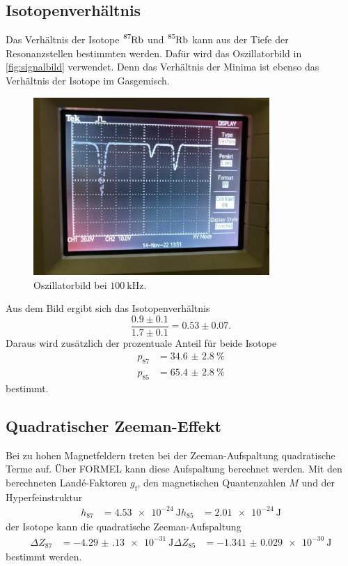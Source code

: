 \subsection{Isotopenverhältnis}
\label{ssec:verhältnis}

Das Verhältnis der Isotope $\ce{^{87}Rb}$ und $\ce{^{85}Rb}$ kann aus der Tiefe der Resonanzstellen bestimmten werden.
Dafür wird das Oszillatorbild in \autoref{fig:signalbild} verwendet.
Denn das Verhältnis der Minima ist ebenso das Verhältnis der Isotope im Gasgemisch.
\begin{figure}
    \centering
    \includegraphics[width=0.8\textwidth]{plots/signalbild.jpeg}
    \caption{Oszillatorbild bei $\qty{100}{\kilo\hertz}$.}
    \label{fig:signalbild}
\end{figure}
Aus dem Bild ergibt sich das Isotopenverhältnis
\begin{equation}
    \frac{0.9 \pm 0.1}{1.7 \pm 0.1} = 0.53 \pm 0.07.
\end{equation}
Daraus wird zusätzlich der prozentuale Anteil für beide Isotope
\begin{align*}
    p_\text{87} &= \qty{34.6(28)}{\percent} \\
    p_\text{85} &= \qty{65.4(28)}{\percent}
\end{align*}
bestimmt.

\subsection{Quadratischer Zeeman-Effekt}
\label{ssec:zeeman}

Bei zu hohen Magnetfeldern treten bei der Zeeman-Aufspaltung quadratische Terme auf.
Über FORMEL kann diese Aufspaltung berechnet werden.
Mit den berechneten Landé-Faktoren $g_\text{f}$, den magnetischen Quantenzahlen $M$ und der Hyperfeinstruktur 
\begin{align*}
    h_{87} &= \qty{4.53e-24}{\joule} 
    h_{85} &= \qty{2.01e-24}{\joule}
\end{align*}
der Isotope kann die quadratische Zeeman-Aufspaltung 
\begin{align*}
    \Delta Z_{87} &= \qty{-4.29(13)e-31}{\joule} 
    \Delta Z_{85} &= \qty{-1.341(29)e-30}{\joule}
\end{align*}
bestimmt werden.

